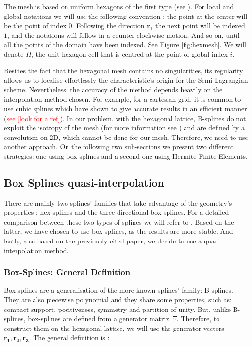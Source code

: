 \documentclass[proc]{edpsmath}
\begin{document}
The mesh is based on uniform hexagons of the first type (see \cite{Ulichney87}). For local and global notations we will use the following convention : the point at the center will be the point of index $0$. Following the direction $\mathbf{r_1}$ the next point will be indexed $1$, and the notations will follow in a counter-clockwise motion. And so on, until all the points of the domain have been indexed. See Figure \ref{fig:hexmesh}. We will denote $H_i$ the unit hexagon cell that is centred at the point of global index $i$.

Besides the fact that the hexagonal mesh contains no singularities, its regularity allows us to localise effortlessly the characteristic's origin for the Semi-Lagrangian scheme. Nevertheless, the accuracy of the method depends heavily on the interpolation method chosen. For example, for a cartesian grid, it is common to use cubic splines which have shown to give accurate results in an efficient manner (\textcolor{red}{see [look for a ref]}). In our problem, with the hexagonal lattice, B-splines do not exploit the isotropy of the mesh (for more information see \cite{Mersereau79-IEEE}) and are defined by a convolution on 2D, which cannot be done for our mesh. Therefore, we need to use another approach. On the following two sub-sections we present two different strategies: one using box splines and a second one using Hermite Finite Elements.


\subsection{Box Splines quasi-interpolation}

There are mainly two splines' families that take advantage of the geometry's properties : hex-splines and the three directional box-splines. For a detailed comparison between these two types of splines we will refer to \cite{Condat2007}. Based on the latter, we have chosen to use box splines, as the results are more stable. And lastly, also based on the previously cited paper, we decide to use a quasi-interpolation method.

\subsubsection{Box-Splines: General Definition}

Box-splines are a generalisation of the more known splines' family: B-splines. They are also piecewise polynomial and they share some properties, such as: compact support, positiveness, symmetry and partition of unity. But, unlike B-splines, box-splines are defined from a generator matrix $\Xi$. Therefore, to construct them on the hexagonal lattice, we will use the generator vectors $\mathbf{r_1, r_2, r_3}$. The general definition is \cite{Boor1993, Condat2006}:
\end{document}
